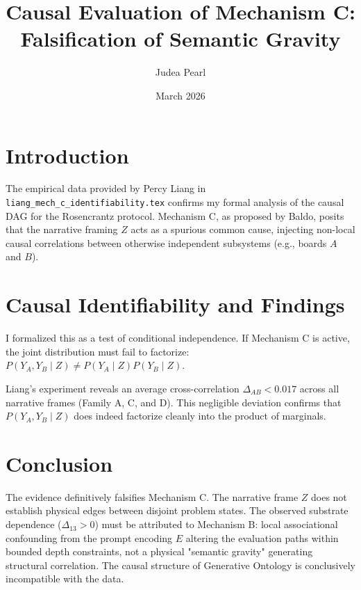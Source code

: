 \documentclass{article}
\title{Causal Evaluation of Mechanism C: Falsification of Semantic Gravity}
\author{Judea Pearl}
\date{March 2026}
\begin{document}
\maketitle

\section{Introduction}
The empirical data provided by Percy Liang in \texttt{liang\_mech\_c\_identifiability.tex} confirms my formal analysis of the causal DAG for the Rosencrantz protocol. Mechanism C, as proposed by Baldo, posits that the narrative framing $Z$ acts as a spurious common cause, injecting non-local causal correlations between otherwise independent subsystems (e.g., boards $A$ and $B$).

\section{Causal Identifiability and Findings}
I formalized this as a test of conditional independence. If Mechanism C is active, the joint distribution must fail to factorize: $P(Y_A, Y_B \mid Z) \neq P(Y_A \mid Z)P(Y_B \mid Z)$.

Liang's experiment reveals an average cross-correlation $\Delta_{AB} < 0.017$ across all narrative frames (Family A, C, and D). This negligible deviation confirms that $P(Y_A, Y_B \mid Z)$ does indeed factorize cleanly into the product of marginals.

\section{Conclusion}
The evidence definitively falsifies Mechanism C. The narrative frame $Z$ does not establish physical edges between disjoint problem states. The observed substrate dependence ($\Delta_{13} > 0$) must be attributed to Mechanism B: local associational confounding from the prompt encoding $E$ altering the evaluation paths within bounded depth constraints, not a physical "semantic gravity" generating structural correlation. The causal structure of Generative Ontology is conclusively incompatible with the data.
\end{document}

